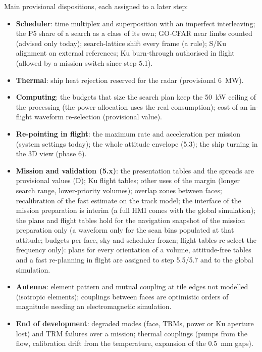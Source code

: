 \documentclass[11pt,a4paper]{article}
\begin{document}
Main provisional dispositions, each assigned to a later step:
\begin{itemize}
  \item \textbf{Scheduler}: time multiplex and superposition with an imperfect interleaving; the P5 share of a search
        as a class of its own; GO-CFAR near limbs counted (advised only today); search-lattice
        shift every frame (a rule); S/Ku alignment on external references; Ku burn-through authorised in flight (allowed by a mission switch since step 5.1).
  \item \textbf{Thermal}: ship heat rejection reserved for the radar (provisional \SI{6}{MW}).
  \item \textbf{Computing}: the budgets that size the search plan keep the \SI{50}{kW} ceiling of the processing (the
        power allocation uses the real consumption); cost of an in-flight waveform re-selection (provisional value).
  \item \textbf{Re-pointing in flight}: the maximum rate and acceleration per mission (system settings today); the
        whole attitude envelope (5.3); the ship turning in the 3D view (phase 6).
  \item \textbf{Mission and validation (5.x)}: the presentation tables and the spreads are provisional values (D);
        Ku flight tables; other uses of the margin (longer search range, lower-priority volumes); overlap zones
        between faces; recalibration of the fast estimate on the track model;
        the interface of the mission preparation is interim (a full HMI comes with the global simulation); the
        plans and flight tables hold for the navigation snapshot of the mission preparation only (a waveform only
        for the scan bins populated at that attitude; budgets per face, sky and scheduler frozen; flight tables
        re-select the frequency only): plans for every orientation of a volume, attitude-free tables and a fast
        re-planning in flight are assigned to step 5.5/5.7 and to the global simulation.
  \item \textbf{Antenna}: element pattern and mutual coupling at tile edges not modelled (isotropic elements);
        couplings between faces are optimistic orders of magnitude needing an electromagnetic simulation.
  \item \textbf{End of development}: degraded modes (face, TRMs, power or Ku aperture lost) and TRM failures over a
        mission; thermal couplings (pumps from the flow, calibration drift from the temperature, expansion of the
        \SI{0.5}{mm} gaps).
\end{itemize}
\end{document}
